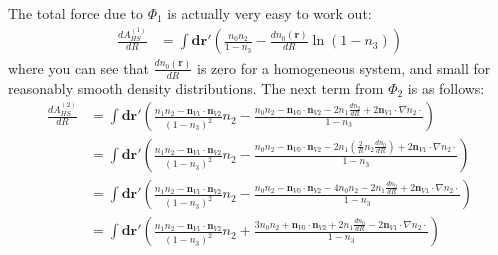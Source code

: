 \documentclass[letterpaper,twocolumn,amsmath,amssymb,prb]{revtex4-1}
\begin{document}
{  The total force due to $\Phi_1$ is actually very easy to work out:
  \begin{align}
    \frac{d A_{HS}^{(1)}}{d R} &=
    \int \mathbf{dr}' \left(\frac{n_0n_2}{1-n_3} - \frac{dn_0(\mathbf{r})}{dR}\ln(1-n_3) \right)
  \end{align}
  where you can see that $\frac{dn_0(\mathbf{r})}{dR}$ is zero for a
  homogeneous system, and small for reasonably smooth density
  distributions.  The next term from $\Phi_2$ is as follows:
  \begin{align}
    \frac{d A_{HS}^{(2)}}{d R} &=
    \int \mathbf{dr}' \left(
    \frac{n_1 n_2 - \mathbf{n}_{V1} \cdot\mathbf{n}_{V2}}{(1-n_3)^2}
    n_2
    - \frac{n_0n_2 - \mathbf{n}_{V0} \cdot\mathbf{n}_{V2} - 2 n_1
      \frac{dn_2}{dR} + 2 \mathbf{n}_{V1} \cdot \nabla n_2 \cdot
    }{1-n_3}
    \right) \\
    &= \int \mathbf{dr}' \left(
    \frac{n_1 n_2 - \mathbf{n}_{V1} \cdot\mathbf{n}_{V2}}{(1-n_3)^2}
    n_2
    - \frac{n_0n_2 - \mathbf{n}_{V0} \cdot\mathbf{n}_{V2}
      - 2 n_1 \left(\frac2{R}n_2 \frac{dn_0}{dR}\right)
      + 2 \mathbf{n}_{V1} \cdot \nabla n_2 \cdot }{1-n_3}
    \right) \\
    &= \int \mathbf{dr}' \left(
    \frac{n_1 n_2 - \mathbf{n}_{V1} \cdot\mathbf{n}_{V2}}{(1-n_3)^2}
    n_2
    - \frac{n_0n_2 - \mathbf{n}_{V0} \cdot\mathbf{n}_{V2}
      - 4 n_0n_2 - 2 n_1\frac{dn_0}{dR}
      + 2 \mathbf{n}_{V1} \cdot \nabla n_2 \cdot }{1-n_3}
    \right) \\
    &= \int \mathbf{dr}' \left(
    \frac{n_1 n_2 - \mathbf{n}_{V1} \cdot\mathbf{n}_{V2}}{(1-n_3)^2}
    n_2
    + \frac{3n_0n_2 + \mathbf{n}_{V0} \cdot\mathbf{n}_{V2}
      + 2 n_1\frac{dn_0}{dR}
      - 2 \mathbf{n}_{V1} \cdot \nabla n_2 \cdot }{1-n_3}
    \right)
  \end{align}
  
}
\end{document}
